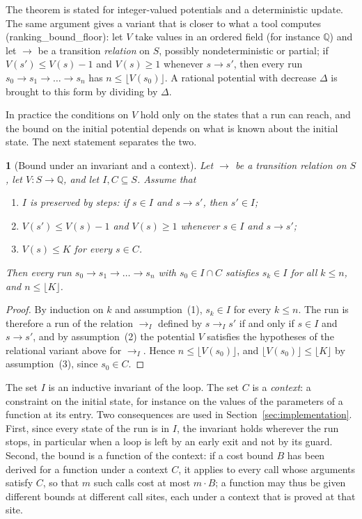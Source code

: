 \documentclass[oneside,english]{amsart}
\numberwithin{equation}{section}
\numberwithin{figure}{section}
\theoremstyle{plain}
\theoremstyle{definition}
\theoremstyle{plain}
\newtheorem{prop}[thm]{\protect\propositionname}
\theoremstyle{remark}
\theoremstyle{plain}
\theoremstyle{definition}
\theoremstyle{plain}
\theoremstyle{remark}
\newcommand{\lean}[1]{{\ttfamily\small #1}}
\providecommand{\propositionname}{Proposition}
\begin{document}
The theorem is stated for integer-valued potentials and a deterministic update. The same argument gives a variant that is closer to what a tool computes (\lean{ranking\_\allowbreak bound\_\allowbreak floor}): let $V$ take values in an ordered field (for instance $\mathbb{Q}$) and let $\to$ be a transition \emph{relation} on $S$, possibly nondeterministic or partial; if $V(s') \le V(s) - 1$ and $V(s) \ge 1$ whenever $s \to s'$, then every run $s_0 \to s_1 \to \dots \to s_n$ has $n \le \lfloor V(s_0) \rfloor$. A rational potential with decrease $\Delta$ is brought to this form by dividing by $\Delta$.

In practice the conditions on $V$ hold only on the states that a run can reach, and the bound on the initial potential depends on what is known about the initial state. The next statement separates the two.

\begin{prop}[Bound under an invariant and a context]
\label{prop:context-bound}
Let $\to$ be a transition relation on $S$, let $V : S \to \mathbb{Q}$, and let $I, C \subseteq S$. Assume that
\begin{enumerate}
    \item $I$ is preserved by steps: if $s \in I$ and $s \to s'$, then $s' \in I$;
    \item $V(s') \le V(s) - 1$ and $V(s) \ge 1$ whenever $s \in I$ and $s \to s'$;
    \item $V(s) \le K$ for every $s \in C$.
\end{enumerate}
Then every run $s_0 \to s_1 \to \dots \to s_n$ with $s_0 \in I \cap C$ satisfies $s_k \in I$ for all $k \le n$, and $n \le \lfloor K \rfloor$.
\end{prop}

\begin{proof}
By induction on $k$ and assumption~(1), $s_k \in I$ for every $k \le n$. The run is therefore a run of the relation $\to_I$ defined by $s \to_I s'$ if and only if $s \in I$ and $s \to s'$, and by assumption~(2) the potential $V$ satisfies the hypotheses of the relational variant above for $\to_I$. Hence $n \le \lfloor V(s_0) \rfloor$, and $\lfloor V(s_0) \rfloor \le \lfloor K \rfloor$ by assumption~(3), since $s_0 \in C$.
\end{proof}

The set $I$ is an inductive invariant of the loop. The set $C$ is a \emph{context}: a constraint on the initial state, for instance on the values of the parameters of a function at its entry. Two consequences are used in Section~\ref{sec:implementation}. First, since every state of the run is in $I$, the invariant holds wherever the run stops, in particular when a loop is left by an early exit and not by its guard. Second, the bound is a function of the context: if a cost bound $B$ has been derived for a function under a context $C$, it applies to every call whose arguments satisfy $C$, so that $m$ such calls cost at most $m \cdot B$; a function may thus be given different bounds at different call sites, each under a context that is proved at that site.
\end{document}
